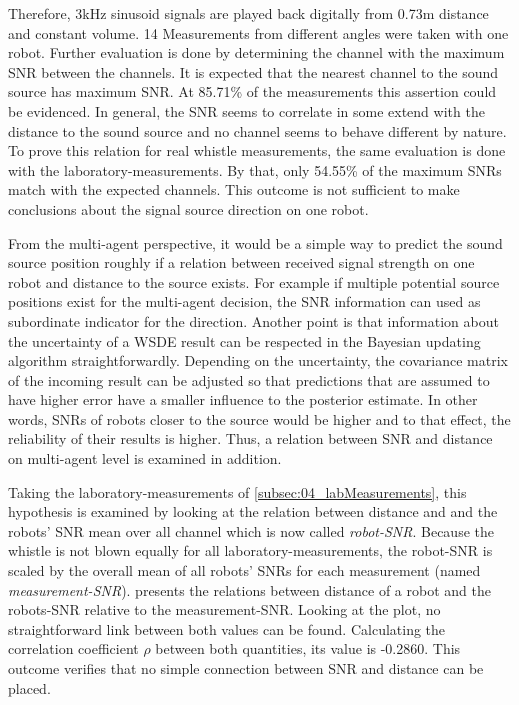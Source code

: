 Therefore, 3\si{\kilo\hertz} sinusoid signals are played back digitally from
0.73\si{\meter} distance and constant volume.
14 Measurements from different angles were taken with one robot.
Further evaluation is done by determining the channel with the maximum
\ac{SNR} between the channels.
It is expected that the nearest channel to the sound source has maximum \ac{SNR}.
At 85.71\si{\percent} of the measurements this assertion could be
evidenced.
In general, the \ac{SNR} seems to correlate in some extend with the
distance to the sound source and no channel seems to behave different
by nature.
To prove this relation for real whistle measurements, the same evaluation is
done with the laboratory-measurements.
By that, only 54.55\si{\percent} of the maximum \acp{SNR} match with the expected
channels.
This outcome is not sufficient to make conclusions about the signal source
direction on one robot.

From the multi-agent perspective, it would be a simple way to predict the sound
source position roughly if a relation between received signal strength on one robot
and distance to the source exists.
For example if multiple potential source positions exist for the multi-agent decision,
the \ac{SNR} information can used as subordinate indicator for the direction.
Another point is that information about the uncertainty of a \ac{WSDE} result
can be respected in the Bayesian updating algorithm straightforwardly.
Depending on the uncertainty, the covariance matrix of the incoming result can
be adjusted so that predictions that are assumed to have higher error have
a smaller influence to the posterior estimate.
In other words, \acp{SNR} of robots closer to the source would be higher
and to that effect, the reliability of their results is higher.
Thus, a relation between \ac{SNR} and distance on multi-agent level is examined in addition.


Taking the laboratory-measurements of \cref{subsec:04_labMeasurements}, this
hypothesis is examined by looking at the relation between distance and and the robots'
\ac{SNR} mean over all channel which is now called \textit{robot-\ac{SNR}}.
Because the whistle is not blown equally for all laboratory-measurements,
the robot-\ac{SNR} is scaled by the overall mean of all robots' \acp{SNR} for each
measurement (named \textit{measurement-\ac{SNR}}).
 presents the relations between distance of a robot
and the robots-\ac{SNR} relative to the measurement-\ac{SNR}.
Looking at the plot, no straightforward link between both values can be found.
Calculating the correlation coefficient $\rho$ between both quantities,
its value is -0.2860.
This outcome verifies that no simple connection between \ac{SNR} and distance
can be placed.

